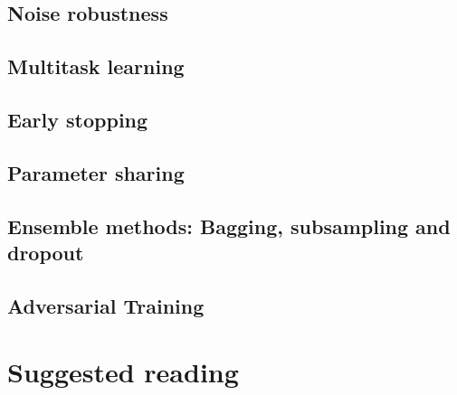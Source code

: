 \subsection{Noise robustness}
\subsection{Multitask learning}
\subsection{Early stopping}
\subsection{Parameter sharing}
\subsection{Ensemble methods: Bagging, subsampling and dropout}
\subsection{Adversarial Training}


\section{Suggested reading}

